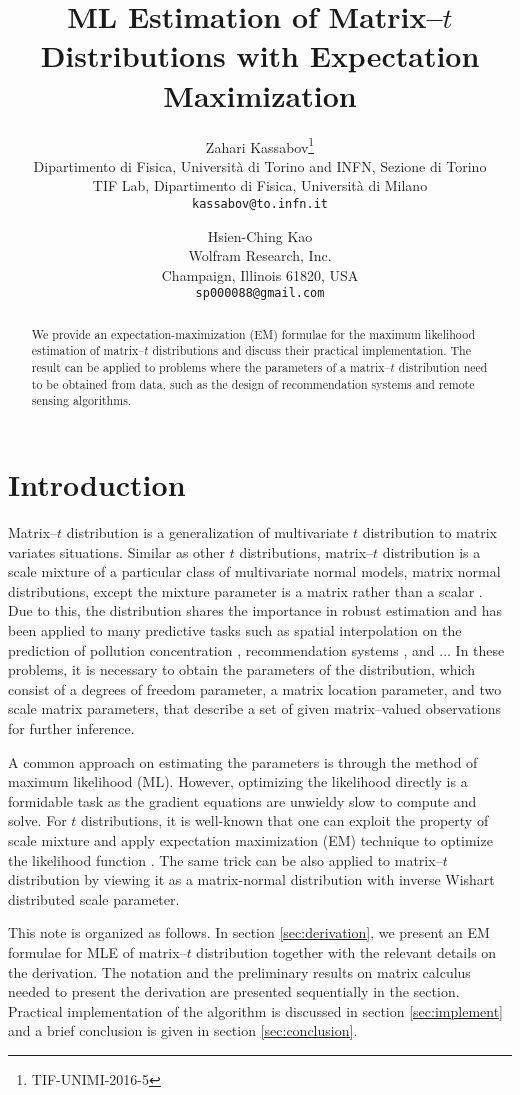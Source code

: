\documentclass[english,listof=totoc]{scrartcl}
\title{ML Estimation of Matrix--$t$ Distributions with Expectation Maximization}
\author{Zahari Kassabov\thanks{TIF-UNIMI-2016-5}\\
        Dipartimento di Fisica, Universit\`a di Torino and INFN, Sezione di Torino\\
		TIF Lab, Dipartimento di Fisica, Universit\`a di Milano\\
        \texttt{kassabov@to.infn.it}\\
        \and
        Hsien-Ching Kao\\
        Wolfram Research, Inc.\\
		Champaign, Illinois 61820, USA\\
		\texttt{sp000088@gmail.com}
		}
\begin{document}
\maketitle

\begin{abstract}
We provide an expectation-maximization (EM) formulae for the maximum likelihood estimation of matrix--$t$ distributions and discuss their practical implementation. The result can be applied to problems where the parameters of a matrix--$t$ distribution need to be obtained from data, such as the design of recommendation systems and remote sensing algorithms.
\end{abstract}

\section{Introduction}
Matrix--$t$ distribution is a generalization of multivariate $t$ distribution to matrix variates situations. Similar as other $t$ distributions, matrix--$t$ distribution is a scale mixture of a particular class of multivariate normal models, matrix normal distributions, except the mixture parameter is a matrix rather than a scalar \citep{gupta1999matrix}. Due to this, the distribution shares the importance in robust estimation and has been applied to many predictive tasks such as spatial interpolation on the prediction of pollution concentration \citep{KIBRIA2006785}, recommendation systems \citep{NIPS2007_3203}, and ... In these problems, it is necessary to obtain the parameters of the distribution, which consist of a degrees of freedom parameter, a matrix location parameter, and two scale matrix parameters, that describe a set of given matrix--valued observations for further inference.

A common approach on estimating the parameters is through the method of maximum likelihood (ML). However, optimizing the likelihood directly is a formidable task as the gradient equations are unwieldy slow to compute and solve. For $t$ distributions, it is well-known that one can exploit the property of scale mixture and apply expectation maximization (EM) technique to optimize the likelihood function \citep{10.2307/24305551}. The same trick can be also applied to matrix--$t$ distribution by viewing it as a matrix-normal distribution with inverse Wishart distributed scale parameter.

This note is organized as follows. In section \ref{sec:derivation}, we present an EM formulae for MLE of matrix--$t$ distribution together with the relevant details on the derivation. The notation and the preliminary results on matrix calculus needed to present the derivation are presented sequentially in the section. Practical implementation of the algorithm is discussed in section \ref{sec:implement} and a brief conclusion is given in section \ref{sec:conclusion}.
\end{document}
